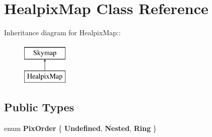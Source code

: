 \hypertarget{classHealpixMap}{
\section{HealpixMap Class Reference}
\label{classHealpixMap}
}
Inheritance diagram for HealpixMap::\begin{figure}[H]
\begin{center}
\leavevmode
\includegraphics[height=2cm]{classHealpixMap}
\end{center}
\end{figure}
\subsection*{Public Types}
\begin{DoxyCompactItemize}
\item 
enum {\bfseries PixOrder} \{ {\bfseries Undefined}, 
{\bfseries Nested}, 
{\bfseries Ring}
 \}
\end{DoxyCompactItemize}
